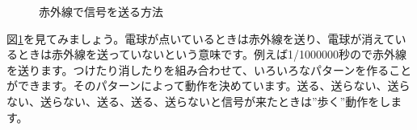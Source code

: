 \begin{figure}[H]
\centering

\caption{赤外線で信号を送る方法}
\label{ir}
\end{figure}

図\ref{ir}を見てみましょう。電球が点いているときは赤外線を送り、電球が消えているときは赤外線を送っていないという意味です。例えば1/1000000秒ので赤外線を送ります。つけたり消したりを組み合わせて、いろいろなパターンを作ることができます。そのパターンによって動作を決めています。送る、送らない、送らない、送らない、送る、送る、送らないと信号が来たときは”歩く”動作をします。
